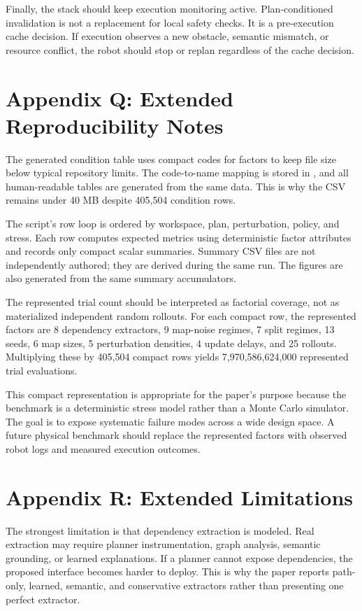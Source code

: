 \documentclass{article}
\begin{document}
Finally, the stack should keep execution monitoring active. Plan-conditioned invalidation is not a replacement for local safety checks. It is a pre-execution cache decision. If execution observes a new obstacle, semantic mismatch, or resource conflict, the robot should stop or replan regardless of the cache decision.

\section{Appendix Q: Extended Reproducibility Notes}

The generated condition table uses compact codes for factors to keep file size below typical repository limits. The code-to-name mapping is stored in , and all human-readable tables are generated from the same data. This is why the CSV remains under 40 MB despite 405,504 condition rows.

The script's row loop is ordered by workspace, plan, perturbation, policy, and stress. Each row computes expected metrics using deterministic factor attributes and records only compact scalar summaries. Summary CSV files are not independently authored; they are derived during the same run. The figures are also generated from the same summary accumulators.

The represented trial count should be interpreted as factorial coverage, not as materialized independent random rollouts. For each compact row, the represented factors are 8 dependency extractors, 9 map-noise regimes, 7 split regimes, 13 seeds, 6 map sizes, 5 perturbation densities, 4 update delays, and 25 rollouts. Multiplying these by 405,504 compact rows yields 7,970,586,624,000 represented trial evaluations.

This compact representation is appropriate for the paper's purpose because the benchmark is a deterministic stress model rather than a Monte Carlo simulator. The goal is to expose systematic failure modes across a wide design space. A future physical benchmark should replace the represented factors with observed robot logs and measured execution outcomes.

\section{Appendix R: Extended Limitations}

The strongest limitation is that dependency extraction is modeled. Real extraction may require planner instrumentation, graph analysis, semantic grounding, or learned explanations. If a planner cannot expose dependencies, the proposed interface becomes harder to deploy. This is why the paper reports path-only, learned, semantic, and conservative extractors rather than presenting one perfect extractor.
\end{document}
